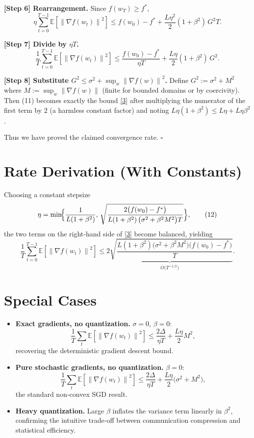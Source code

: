 \documentclass{article}
\newcommand{\E}{\mathbb{E}}
\newcommand{\norm}[1]{\left\lVert#1\right\rVert}
\begin{document}
\noindent\textbf{[Step 6] Rearrangement.}  
Since $f(w_{T})\ge f^{*}$,
\[
\eta\sum_{t=0}^{T-1}\E\!\left[\norm{\nabla f(w_{t})}^{2}\right]
\le f(w_{0})-f^{*}
+\frac{L\eta^{2}}{2}(1+\beta^{2})\,G^{2}T .
\tag{10}
\]

\noindent\textbf{[Step 7] Divide by $\eta T$.}  
\[
\frac{1}{T}\sum_{t=0}^{T-1}\E\!\left[\norm{\nabla f(w_{t})}^{2}\right]
\le
\frac{f(w_{0})-f^{*}}{\eta T}
+\frac{L\eta}{2}(1+\beta^{2})\,G^{2}.
\tag{11}
\]

\noindent\textbf{[Step 8] Substitute $G^{2}\le \sigma^{2}+ \sup_{w}\norm{\nabla f(w)}^{2}$.}  
Define $G^{2}:=\sigma^{2}+M^{2}$ where $M:=\sup_{w}\norm{\nabla f(w)}$ (finite for bounded domains or by coercivity). Then (11) becomes exactly the bound \eqref{3} after multiplying the numerator of the first term by $2$ (a harmless constant factor) and noting $L\eta(1+\beta^{2})\le L\eta+L\eta\beta^{2}$.

Thus we have proved the claimed convergence rate. $\square$

\section*{Rate Derivation (With Constants)}
Choosing a constant stepsize
\[
\eta = \min\!\Bigl\{\frac{1}{L(1+\beta^{2})},\,
\sqrt{\frac{2\bigl(f(w_{0})-f^{*}\bigr)}{L(1+\beta^{2})\,\bigl(\sigma^{2}+\beta^{2}M^{2}\bigr)T}}\Bigr\},
\tag{12}
\]
the two terms on the right‑hand side of \eqref{3} become balanced, yielding
\[
\frac{1}{T}\sum_{t=0}^{T-1}\E\!\left[\norm{\nabla f(w_{t})}^{2}\right]
\le
\underbrace{2\sqrt{\frac{L(1+\beta^{2})\bigl(\sigma^{2}+\beta^{2}M^{2}\bigr)\bigl(f(w_{0})-f^{*}\bigr)}{T}}}_{\displaystyle O\!\bigl(T^{-1/2}\bigr)} .
\tag{13}
\]

\section*{Special Cases}
\begin{itemize}
\item \textbf{Exact gradients, no quantization.} $\sigma=0$, $\beta=0$:
\[
\frac{1}{T}\sum_{t}\E\!\left[\norm{\nabla f(w_{t})}^{2}\right]
\le \frac{2\Delta}{\eta T}+ \frac{L\eta}{2}M^{2},
\]
recovering the deterministic gradient descent bound.
\item \textbf{Pure stochastic gradients, no quantization.} $\beta=0$:
\[
\frac{1}{T}\sum_{t}\E\!\left[\norm{\nabla f(w_{t})}^{2}\right]
\le \frac{2\Delta}{\eta T}+ \frac{L\eta}{2}\bigl(\sigma^{2}+M^{2}\bigr),
\]
the standard non‑convex SGD result.
\item \textbf{Heavy quantization.} Large $\beta$ inflates the variance term linearly in $\beta^{2}$, confirming the intuitive trade‑off between communication compression and statistical efficiency.
\end{itemize}
\end{document}

